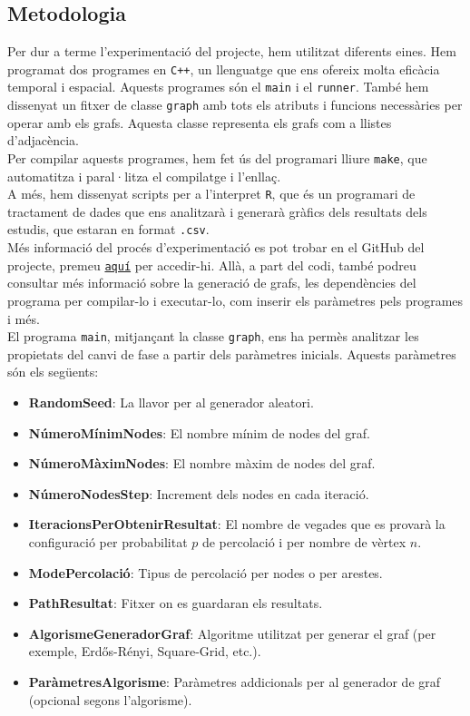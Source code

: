 \documentclass[a4paper]{article}
\begin{document}
	\subsection{Metodologia}
	
	Per dur a terme l'experimentació del projecte, hem utilitzat diferents eines. Hem programat dos programes en \texttt{C++}, un llenguatge que ens ofereix molta eficàcia temporal i espacial. Aquests programes són el \texttt{main} i el \texttt{runner}. També hem dissenyat un fitxer de classe \texttt{graph} amb tots els atributs i funcions necessàries per operar amb els grafs. Aquesta classe representa els grafs com a llistes d'adjacència. \\
	
	Per compilar aquests programes, hem fet ús del programari lliure \texttt{make}, que automatitza i paral·litza el compilatge i l'enllaç. \\
	
	A més, hem dissenyat scripts per a l'interpret \texttt{R}, que és un programari de tractament de dades que ens analitzarà i generarà gràfics dels resultats dels estudis, que estaran en format \texttt{.csv}. \\
	
	Més informació del procés d'experimentació es pot trobar en el GitHub del projecte, premeu \href{https://github.com/Willyllem88/PercolationConnectivity}{\texttt{aquí}} per accedir-hi. Allà, a part del codi, també podreu consultar més informació sobre la generació de grafs, les dependències del programa per compilar-lo i executar-lo, com inserir els paràmetres pels programes i més. \\
	
	El programa \texttt{main}, mitjançant la classe \texttt{graph}, ens ha permès analitzar les propietats del canvi de fase a partir dels paràmetres inicials. Aquests paràmetres són els següents:
	
	\begin{itemize}
		\item \textbf{RandomSeed}: La llavor per al generador aleatori.
		\item \textbf{NúmeroMínimNodes}: El nombre mínim de nodes del graf.
		\item \textbf{NúmeroMàximNodes}: El nombre màxim de nodes del graf.
		\item \textbf{NúmeroNodesStep}: Increment dels nodes en cada iteració.
		\item \textbf{IteracionsPerObtenirResultat}: El nombre de vegades que es provarà la configuració per probabilitat $p$ de percolació i per nombre de vèrtex $n$.
		\item \textbf{ModePercolació}: Tipus de percolació per nodes o per arestes.
		\item \textbf{PathResultat}: Fitxer on es guardaran els resultats.
		\item \textbf{AlgorismeGeneradorGraf}: Algoritme utilitzat per generar el graf (per exemple, Erdős-Rényi, Square-Grid, etc.).
		\item \textbf{ParàmetresAlgorisme}: Paràmetres addicionals per al generador de graf (opcional segons l'algorisme).
	\end{itemize}
	
\end{document}
